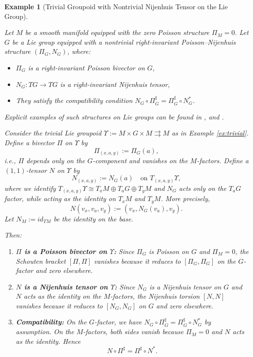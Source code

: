 \documentclass{article}
\newcommand{\II}{\Pi}
\newtheorem{example}[theorem]{Example}
\begin{document}
\begin{example}[Trivial Groupoid with Nontrivial Nijenhuis Tensor on the Lie Group]
\label{ex:nontrivial}

Let $M$ be a smooth manifold equipped with the zero Poisson structure $\Pi_M = 0$. Let $G$ be a Lie group equipped with a nontrivial right-invariant Poisson–Nijenhuis structure $(\Pi_G, N_G)$, where:
\begin{itemize}
    \item $\Pi_G$ is a right-invariant Poisson bivector on $G$,
    \item $N_G: TG \to TG$ is a right-invariant Nijenhuis tensor,
    \item They satisfy the compatibility condition $N_G \circ \Pi_G^\sharp = \Pi_G^\sharp \circ N_G^*$.
\end{itemize}
Explicit examples of such structures on Lie groups can be found in \cite{HA1}, \cite{Ravanpak} and \cite{Haghighat}.

Consider the trivial Lie groupoid $\Upsilon := M \times G \times M \rightrightarrows M$ as in Example \ref{ex:trivial}. Define a bivector $\II$ on $\Upsilon$ by
\[
\II_{(x,a,y)} := \Pi_G(a),
\]
i.e., $\II$ depends only on the $G$-component and vanishes on the $M$-factors. Define a $(1,1)$-tensor $N$ on $\Upsilon$ by
\[
N_{(x,a,y)} := N_G(a) \quad \text{on } T_{(x,a,y)}\Upsilon,
\]
where we identify $T_{(x,a,y)}\Upsilon \cong T_xM \oplus T_aG \oplus T_yM$ and $N_G$ acts only on the $T_aG$ factor, while acting as the identity on $T_xM$ and $T_yM$. More precisely,
\[
N(v_x, v_a, v_y) := (v_x, N_G(v_a), v_y).
\]
Let $N_M := id_{TM}$ be the identity on the base.

Then:
\begin{enumerate}
    \item \textbf{$\II$ is a Poisson bivector on $\Upsilon$:} Since $\Pi_G$ is Poisson on $G$ and $\Pi_M = 0$, the Schouten bracket $[\II, \II]$ vanishes because it reduces to $[\Pi_G, \Pi_G]$ on the $G$-factor and zero elsewhere.

    \item \textbf{$N$ is a Nijenhuis tensor on $\Upsilon$:} Since $N_G$ is a Nijenhuis tensor on $G$ and $N$ acts as the identity on the $M$-factors, the Nijenhuis torsion $[N, N]$ vanishes because it reduces to $[N_G, N_G]$ on $G$ and zero elsewhere.

    \item \textbf{Compatibility:} On the $G$-factor, we have $N_G \circ \Pi_G^\sharp = \Pi_G^\sharp \circ N_G^*$ by assumption. On the $M$-factors, both sides vanish because $\Pi_M = 0$ and $N$ acts as the identity. Hence
    \[
    N \circ \II^\sharp = \II^\sharp \circ N^*.
    \]


\end{enumerate}
\end{example}
\end{document}
